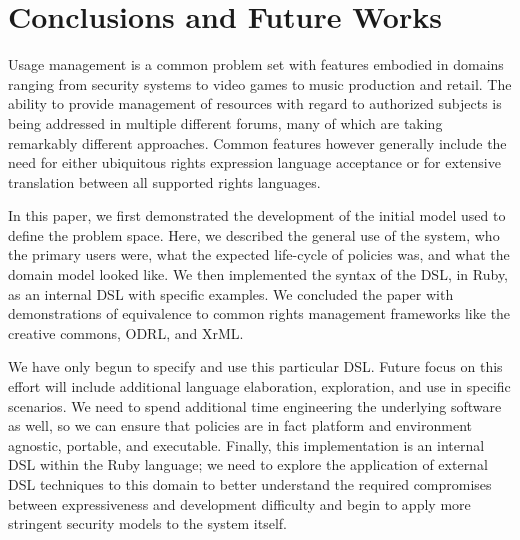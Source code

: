 \section{Conclusions and Future Works}
Usage management is a common problem set with features embodied in domains ranging from security systems to video games to music production and retail.  The ability to provide management of resources with regard to authorized subjects is being addressed in multiple different forums, many of which are taking remarkably different approaches.  Common features however generally include the need for either ubiquitous rights expression language acceptance or for extensive translation between all supported rights languages.

In this paper, we first demonstrated the development of the initial model used to define the problem space.  Here, we described the general use of the system, who the primary users were, what the expected life-cycle of policies was, and what the domain model looked like.  We then implemented the syntax of the DSL, in Ruby, as an internal DSL with specific examples.  We concluded the paper with demonstrations of equivalence to common rights management frameworks like the creative commons, ODRL, and XrML.

We have only begun to specify and use this particular DSL.  Future focus on this effort will include additional language elaboration, exploration, and use in specific scenarios.  We need to spend additional time engineering the underlying software as well, so we can ensure that policies are in fact platform and environment agnostic, portable, and executable.  Finally, this implementation is an internal DSL within the Ruby language; we need to explore the application of external DSL techniques to this domain to better understand the required compromises between expressiveness and development difficulty and begin to apply more stringent security models to the system itself.